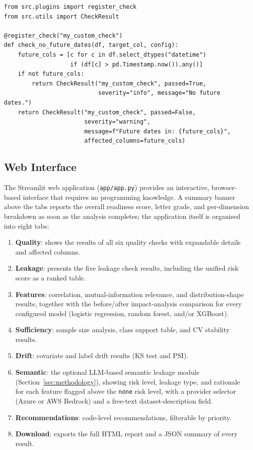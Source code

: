 \documentclass[12pt,a4paper]{report}
\begin{document}
\begin{lstlisting}[caption={Custom plugin example.}]
from src.plugins import register_check
from src.utils import CheckResult

@register_check("my_custom_check")
def check_no_future_dates(df, target_col, config):
    future_cols = [c for c in df.select_dtypes("datetime")
                   if (df[c] > pd.Timestamp.now()).any()]
    if not future_cols:
        return CheckResult("my_custom_check", passed=True,
                           severity="info", message="No future dates.")
    return CheckResult("my_custom_check", passed=False,
                       severity="warning",
                       message=f"Future dates in: {future_cols}",
                       affected_columns=future_cols)
\end{lstlisting}

\subsection{Web Interface}

The Streamlit web application (\texttt{app/app.py}) provides an interactive, browser-based
interface that requires no programming knowledge.  A summary banner above the tabs reports
the overall readiness score, letter grade, and per-dimension breakdown as soon as the
analysis completes; the application itself is organised into eight tabs:

\begin{enumerate}[leftmargin=1.5em]
\item \textbf{Quality}: shows the results of all six quality checks with expandable
  details and affected columns.
\item \textbf{Leakage}: presents the five leakage check results, including the
  unified risk score as a ranked table.
\item \textbf{Features}: correlation, mutual-information relevance, and distribution-shape
  results, together with the before/after impact-analysis comparison for every configured
  model (logistic regression, random forest, and/or XGBoost).
\item \textbf{Sufficiency}: sample size analysis, class support table, and CV stability results.
\item \textbf{Drift}: covariate and label drift results (KS test and PSI).
\item \textbf{Semantic}: the optional LLM-based semantic leakage module (Section~\ref{sec:methodology}),
  showing risk level, leakage type, and rationale for each feature flagged above the
  \texttt{none} risk level, with a provider selector (Azure or AWS Bedrock) and a free-text
  dataset-description field.
\item \textbf{Recommendations}: code-level recommendations, filterable by priority.
\item \textbf{Download}: exports the full HTML report and a JSON summary of every result.
\end{enumerate}
\end{document}
